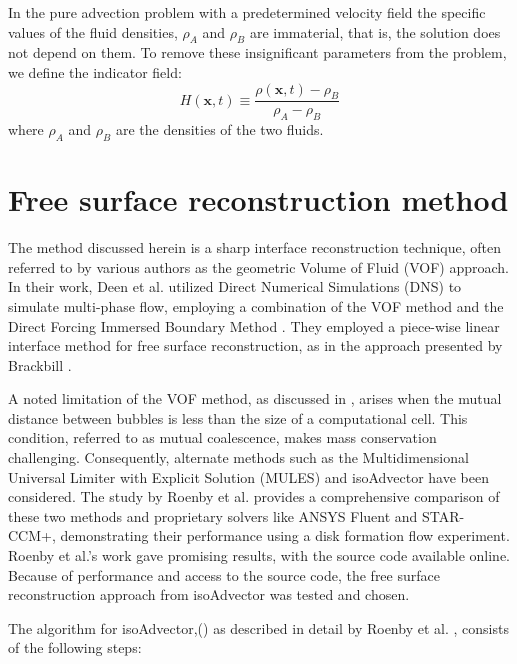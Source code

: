 In the pure advection problem with a predetermined velocity field the specific values of the fluid densities, $\rho_A$ and $\rho_B$ are immaterial, that is, the solution does not depend on them. To remove these insignificant parameters from the problem, we define the indicator field:
\begin{equation}
H(\mathbf{x}, t) \equiv \frac{\rho(\mathbf{x}, t)-\rho_{B}}{\rho_{A}-\rho_{B}}
\end{equation}
where $\rho_{A}$ and $\rho_{B}$ are the densities of the two fluids.

\section{Free surface reconstruction method}

The method discussed herein is a sharp interface reconstruction technique, often referred to by various authors as the geometric Volume of Fluid (VOF) approach. In their work, Deen et al. \cite{deen2009direct} utilized Direct Numerical Simulations (DNS) to simulate multi-phase flow, employing a combination of the VOF method \cite{hirt1981vof} and the Direct Forcing Immersed Boundary Method \cite{uhlmann2005immersed}. They employed a piece-wise linear interface method for free surface reconstruction, as in the approach presented by Brackbill \cite{brackbill1992continuum}.

A noted limitation of the VOF method, as discussed in \cite{hirt1981vof}, arises when the mutual distance between bubbles is less than the size of a computational cell. This condition, referred to as mutual coalescence, makes mass conservation challenging. Consequently, alternate methods such as the Multidimensional Universal Limiter with Explicit Solution (MULES) \cite{zalesak1979fully} and isoAdvector \cite{roenby2019isoadvector} have been considered. The study by Roenby et al. \cite{roenby2019isoadvector} provides a comprehensive comparison of these two methods and proprietary solvers like ANSYS Fluent and STAR-CCM+, demonstrating their performance using a disk formation flow experiment. Roenby et al.'s work \cite{roenby2019isoadvector} gave promising results, with the source code available online. Because of performance and access to the source code, the free surface reconstruction approach from isoAdvector was tested and chosen.

The algorithm for isoAdvector,(\textbf{}) as described in detail by Roenby et al. \cite{roenby2019isoadvector}, consists of the following steps:
 
